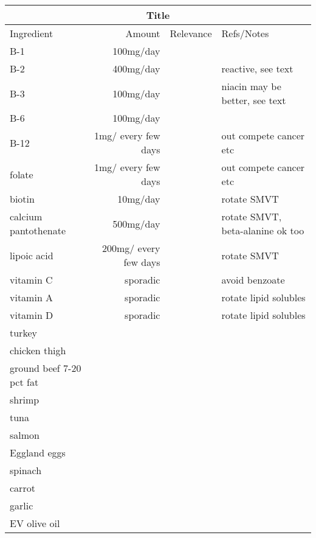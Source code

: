 \begin{table}[H] \centering
\begin{tabular}{|l|r|c|l|}
\hline
\multicolumn{4}{c}{Title}\\
\hline
Ingredient & Amount & Relevance & Refs/Notes \\
\hline
B-1   &   100mg/day   & &  \\
B-2   &   400mg/day   & &  reactive, see text  \\
B-3   &   100mg/day   & &   niacin may be better, see text  \\
B-6   &   100mg/day   & &    \\
B-12   &   1mg/ every few days  & & out compete cancer etc     \\
folate   &   1mg/ every few days  & & out compete cancer etc     \\
biotin   &   10mg/day  & & rotate SMVT     \\
calcium pantothenate   &   500mg/day  & & rotate SMVT, beta-alanine ok too      \\
lipoic acid   &   200mg/ every few days  & & rotate SMVT  \\
\hline
vitamin C  &  sporadic  & & avoid benzoate  \\
vitamin A  &  sporadic  & & rotate lipid solubles  \\
vitamin D  &  sporadic  & & rotate lipid solubles  \\
\hline
turkey  & & & \\
chicken thigh  & & & \\
ground beef 7-20 pct fat  & & & \\
shrimp  & & & \\
tuna  & & & \\
salmon  & & & \\
Eggland eggs  & & & \\
spinach  & & & \\
carrot  & & & \\
garlic  & & & \\
EV olive oil   & & & \\
\hline
\end{tabular}
\caption{}
\end{table}


